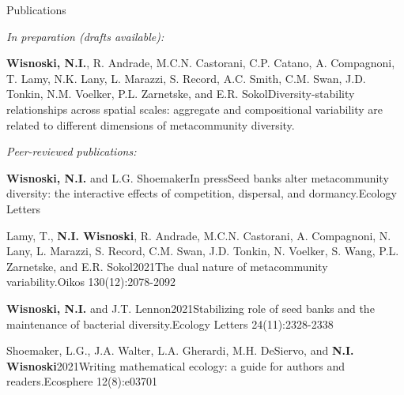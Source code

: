 \documentclass{resume} %
\begin{document}
\begin{rhangSection}{Publications}

{\it In preparation (drafts available):}

\begin{Prep}{{\bf Wisnoski, N.I.}, R. Andrade, M.C.N. Castorani, C.P. Catano, A. Compagnoni, T. Lamy, N.K. Lany, L. Marazzi, S. Record, A.C. Smith, C.M. Swan, J.D. Tonkin, N.M. Voelker, P.L. Zarnetske, and E.R. Sokol}{Diversity-stability relationships across spatial scales: aggregate and compositional variability are related to different dimensions of metacommunity diversity.}
\end{Prep}

% 
% 


\bigskip


{\it Peer-reviewed publications: }

\begin{Publication}{{\bf Wisnoski, N.I.} and L.G. Shoemaker}{In press}{Seed banks alter metacommunity diversity: the interactive effects of competition, dispersal, and dormancy.}{Ecology Letters}
\end{Publication}

\begin{Publication}{Lamy, T., {\bf N.I. Wisnoski}, R. Andrade, M.C.N. Castorani, A. Compagnoni, N. Lany, L. Marazzi, S. Record, C.M. Swan, J.D. Tonkin, N. Voelker, S. Wang, P.L. Zarnetske, and E.R. Sokol}{2021}{The dual nature of metacommunity variability.}{Oikos 130(12):2078-2092}
\end{Publication}

\begin{Publication}{{\bf Wisnoski, N.I.} and J.T. Lennon}{2021}{Stabilizing role of seed banks and the maintenance of bacterial diversity.}{Ecology Letters 24(11):2328-2338}
\end{Publication}

\begin{Publication}{Shoemaker, L.G., J.A. Walter, L.A. Gherardi, M.H. DeSiervo, and {\bf N.I. Wisnoski}}{2021}{Writing mathematical ecology: a guide for authors and readers.}{Ecosphere 12(8):e03701}
\end{Publication}


\end{rhangSection}
\end{document}
